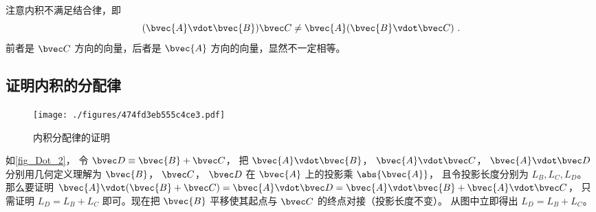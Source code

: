 注意内积不满足结合律，即
\begin{equation}
(\bvec{A} \vdot \bvec{B}) \bvec C \ne  \bvec{A} (\bvec{B} \vdot \bvec C)~.
\end{equation}
前者是 $\bvec C$ 方向的向量，后者是 $\bvec{A}$ 方向的向量，显然不一定相等。

\subsection{证明内积的分配律}
\begin{figure}[ht]
\centering
\texttt{[image: ./figures/474fd3eb555c4ce3.pdf]}
\caption{内积分配律的证明} \label{fig_Dot_2}
\end{figure}

如\autoref{fig_Dot_2}， 令 $\bvec D \equiv \bvec{B} + \bvec C$， 把 $\bvec{A} \vdot \bvec{B}$，  $\bvec{A} \vdot \bvec C$，  $\bvec{A} \vdot \bvec D$ 分别用几何定义理解为 $\bvec{B}$，  $\bvec C$，  $\bvec D$ 在 $\bvec{A}$ 上的投影乘 $\abs{\bvec{A}}$， 且令投影长度分别为 $L_B, L_C, L_D$。 那么要证明 $\bvec{A} \vdot (\bvec{B} + \bvec C) = \bvec{A} \vdot \bvec D = \bvec{A} \vdot \bvec{B} + \bvec{A} \vdot \bvec C$， 只需证明 $L_D = L_B + L_C$ 即可。现在把 $\bvec{B}$ 平移使其起点与 $\bvec C$ 的终点对接（投影长度不变）。 从图中立即得出 $L_D = L_B + L_C$。  
